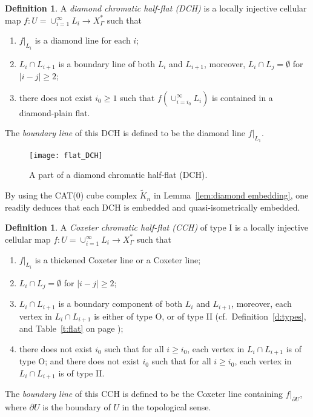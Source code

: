 \documentclass[11pt]{amsart}
\theoremstyle{definition}
\newtheorem{definition}[theorem]{Definition}
\newcommand{\Xa}{X^{\ast}}
\begin{document}
\begin{definition}
	\label{def:DCH}
	A \emph{diamond chromatic half-flat (DCH)} is a locally injective cellular map $f\colon  U=\cup_{i=1}^{\infty} L_i\to \Xa_\Gamma$ such that 
	\begin{enumerate}
		\item $f|_{L_i}$ is a diamond line for each $i$;
		\item $L_i\cap L_{i+1}$ is a boundary line of both $L_i$ and $L_{i+1}$, moreover, $L_i\cap L_j=\emptyset$ for $|i-j|\ge 2$;
		\item there does not exist $i_0\ge 1$ such that $f(\cup_{i=i_0}^{\infty} L_i)$ is contained in a diamond-plain flat.
	\end{enumerate}
The \emph{boundary line} of this DCH is defined to be the diamond line $f|_{L_1}$. 
\end{definition}

\begin{figure}[h!]
	\centering
	\texttt{[image: flat\_DCH]}
	\caption{A part of a diamond chromatic half-flat (DCH).}
	\label{f:flat_DCH}
\end{figure}

By using the CAT(0) cube complex $\widetilde{K}_n$ in Lemma~\ref{lem:diamond embedding}, one readily deduces that each DCH is embedded and quasi-isometrically embedded.

\begin{definition}
	\label{def:CCHI}
	A \emph{Coxeter chromatic half-flat (CCH)} of type I is a locally injective cellular map $f\colon  U=\cup_{i=1}^{\infty} L_i\to \Xa_\Gamma$ such that
	\begin{enumerate}
		\item $f|_{L_i}$ is a thickened Coxeter line or a Coxeter line;
		\item $L_i\cap L_j=\emptyset$ for $|i-j|\ge 2$;
		\item $L_i\cap L_{i+1}$ is a boundary component of both $L_i$ and $L_{i+1}$, moreover, each vertex in $L_i\cap L_{i+1}$ is either of type O, or of type II (cf.\ Definition~\ref{d:types}, and Table~\ref{t:flat} on page \pageref{t:flat});
		\item there does not exist $i_0$ such that for all $i\ge i_0$, each vertex in $L_i\cap L_{i+1}$ is of type O; and  there does not exist $i_0$ such that for all $i\ge i_0$, each vertex in $L_i\cap L_{i+1}$ is of type II.
	\end{enumerate}
The \emph{boundary line} of this CCH is defined to be the Coxeter line containing $f|_{\partial U}$, where $\partial U$ is the boundary of $U$ in the topological sense.
\end{definition}
\end{document}
